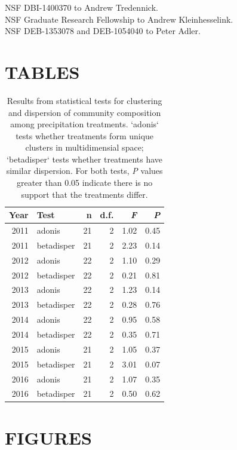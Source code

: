 \documentclass[fleqn,10pt,lineno]{wlpeerj} %
\begin{document}
NSF DBI-1400370 to Andrew Tredennick.\\
NSF Graduate Research Fellowship to Andrew Kleinhesselink.\\
NSF DEB-1353078 and DEB-1054040 to Peter Adler.

\newpage{}

\section{TABLES}\label{tables}

\begin{table}[ht]
\centering
\caption{Results from statistical tests for clustering and dispersion of community composition among precipitation treatments. `adonis` tests whether treatments form unique clusters in multidimensial space; `betadisper` tests whether treatments have similar dispersion. For both tests, \emph{P} values greater than 0.05 indicate there is no support that the treatments differ.} 
\begingroup\normalsize
\begin{tabular}{rlrrrr}
  \hline
Year & Test & n & d.f. & \emph{F} & \emph{P} \\ 
  \hline
2011 & adonis &  21 &   2 & 1.02 & 0.45 \\ 
  2011 & betadisper &  21 &   2 & 2.23 & 0.14 \\ 
  2012 & adonis &  22 &   2 & 1.10 & 0.29 \\ 
  2012 & betadisper &  22 &   2 & 0.21 & 0.81 \\ 
  2013 & adonis &  22 &   2 & 1.23 & 0.14 \\ 
  2013 & betadisper &  22 &   2 & 0.28 & 0.76 \\ 
  2014 & adonis &  22 &   2 & 0.95 & 0.58 \\ 
  2014 & betadisper &  22 &   2 & 0.35 & 0.71 \\ 
  2015 & adonis &  21 &   2 & 1.05 & 0.37 \\ 
  2015 & betadisper &  21 &   2 & 3.01 & 0.07 \\ 
  2016 & adonis &  21 &   2 & 1.07 & 0.35 \\ 
  2016 & betadisper &  21 &   2 & 0.50 & 0.62 \\ 
   \hline
\end{tabular}
\endgroup
\end{table}

\newpage{}

\section{FIGURES}\label{figures}
\end{document}
